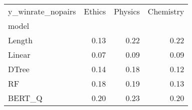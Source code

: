 \begin{tabular}{lrrr}
\toprule
y\_winrate\_nopairs &  Ethics &  Physics &  Chemistry \\
model  &         &          &            \\
\midrule
Length &    0.13 &     0.22 &       0.22 \\
Linear &    0.07 &     0.09 &       0.09 \\
DTree  &    0.14 &     0.18 &       0.12 \\
RF     &    0.18 &     0.19 &       0.13 \\
BERT\_Q &    0.20 &     0.23 &       0.20 \\
\bottomrule
\end{tabular}
